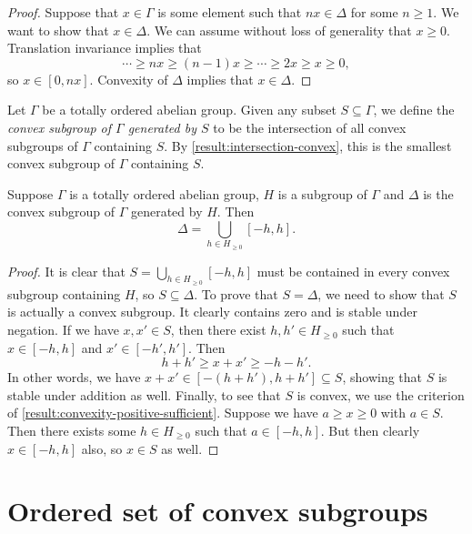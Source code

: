\begin{proof}
Suppose that $x \in \Gamma$ is some element such that $nx \in \Delta$ for some $n \geq 1$. We want to show that $x \in \Delta$. We can assume without loss of generality that $x \geq 0$. Translation invariance implies that
\[ \dotsb \geq nx \geq (n-1)x \geq \dotsb \geq 2x \geq x \geq 0, \]
so $x \in [0, nx]$. Convexity of $\Delta$ implies that $x \in \Delta$. 
\end{proof}

\begin{definition}
Let $\Gamma$ be a totally ordered abelian group. Given any subset $S \subseteq \Gamma$, we define the \emph{convex subgroup of $\Gamma$ generated by $S$} to be the intersection of all convex subgroups of $\Gamma$ containing $S$. By \cref{result:intersection-convex}, this is the smallest convex subgroup of $\Gamma$ containing $S$. 
\end{definition}

\begin{lemma}
	\label{result:convex-subgroup-generated-characterization}
Suppose $\Gamma$ is a totally ordered abelian group, $H$ is a subgroup of $\Gamma$ and $\Delta$ is the convex subgroup of $\Gamma$ generated by $H$. Then 
\[ \Delta = \bigcup_{h \in H_{\geq 0}} [-h, h]. \]
\end{lemma}

\begin{proof}
It is clear that $S = \bigcup_{h \in H_{\geq 0}} [-h, h]$ must be contained in every convex subgroup containing $H$, so $S \subseteq \Delta$. To prove that $S = \Delta$, we need to show that $S$ is actually a convex subgroup. It clearly contains zero and is stable under negation. If we have $x, x' \in S$, then there exist $h, h' \in H_{\geq 0}$ such that $x \in [-h, h]$ and $x' \in [-h', h']$. Then
\[ h + h' \geq x + x' \geq -h - h'. \]
In other words, we have $x + x' \in [-(h+h'), h+h'] \subseteq S$, showing that $S$ is stable under addition as well. Finally, to see that $S$ is convex, we use the criterion of \cref{result:convexity-positive-sufficient}. Suppose we have $a \geq x \geq 0$ with $a \in S$. Then there exists some $h \in H_{\geq 0}$ such that $a \in [-h, h]$. But then clearly $x \in [-h, h]$ also, so $x \in S$ as well. 
\end{proof}

\section{Ordered set of convex subgroups}

